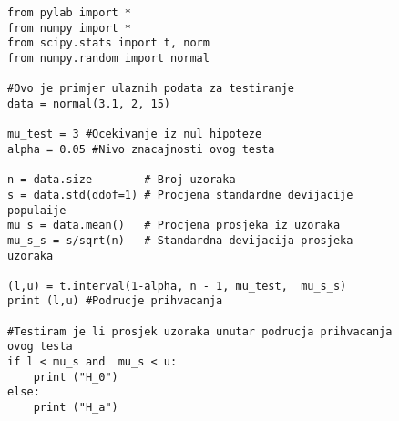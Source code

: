 \begin{figure}[H]
\begin{verbatim}
from pylab import *
from numpy import *
from scipy.stats import t, norm
from numpy.random import normal

#Ovo je primjer ulaznih podata za testiranje
data = normal(3.1, 2, 15)

mu_test = 3 #Ocekivanje iz nul hipoteze
alpha = 0.05 #Nivo znacajnosti ovog testa

n = data.size        # Broj uzoraka
s = data.std(ddof=1) # Procjena standardne devijacije populaije
mu_s = data.mean()   # Procjena prosjeka iz uzoraka
mu_s_s = s/sqrt(n)   # Standardna devijacija prosjeka uzoraka

(l,u) = t.interval(1-alpha, n - 1, mu_test,  mu_s_s)
print (l,u) #Podrucje prihvacanja

#Testiram je li prosjek uzoraka unutar podrucja prihvacanja ovog testa
if l < mu_s and  mu_s < u:
    print ("H_0")
else:
    print ("H_a")
\end{verbatim}
\end{figure}
